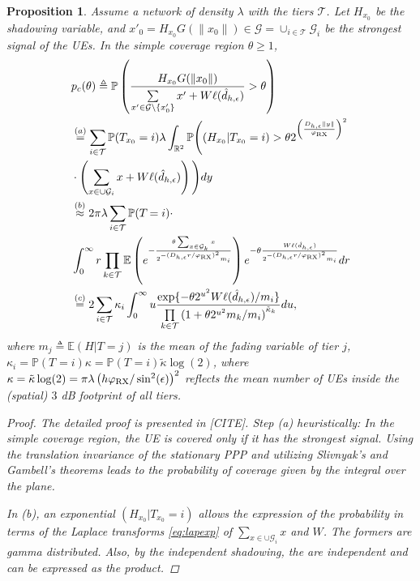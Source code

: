 \documentclass[conference]{IEEEtran}
\newcommand{\R}{\mathbb{R}}
\theoremstyle{definition}
\theoremstyle{plain}
\newtheorem{prop}[thm4]{Proposition}
\begin{document}
            
          \begin{prop}
            Assume a network of density $\lambda$ with the tiers $\mathcal{T}$. Let $H_{x_0}$ be the shadowing variable, and ${x'}_0 =  H_{x_0}G(\|x_0\|) \in \mathcal{G} =\cup_{i \in \mathcal{T}} \mathcal{G}_i$ be the strongest signal of the UEs. In the simple coverage region $\theta \geq 1$,
            \begin{align}
              \label{eq:probofcov}
              &p_c(\theta) \triangleq \mathbb{P}\left( \frac{H_{x_0} G(\|x_0\|)}{\sum\limits_{x' \in   \mathcal{G} \setminus \{x'_0\}}x'  + W\ell(\hat{d}_{h,\epsilon})} > \theta \right) \nonumber \\      
              &\overset{(a)}= \sum_{i\in \mathcal{T}} \mathbb{P}(T_{x_0}  = i)\lambda \int_{ \R^2}\mathbb{P}\Bigg((H_{x_0}|T_{x_0} = i) > \theta  2^{\left(\frac{D_{h,\epsilon}\|y\|}{\varphi_{\textup{RX}}}\right)^2 } \nonumber \\
              &\cdot \left(\sum_{x \in \cup\mathcal{G}_i }x +W\ell(\hat{d}_{h,\epsilon}) \right)\Bigg) \nonumber dy  \nonumber  \\              
              &\overset{(b)}{\approx} 2 \pi \lambda\sum_{i\in \mathcal{T}} \mathbb{P}(T_{}  = i) \cdot \nonumber \\
              &\int_{0}^{\infty} r \prod_{k \in \mathcal{T}}\mathbb{E} \left(e^{-\frac{\theta \sum_{x \in { \mathcal{G}_k}} x}{2^{-(D_{h,\epsilon}r/\varphi_{\textup{RX}})^2} m_i  }}\right)  e^{- \theta   \frac{W\ell(\hat{d}_{h,\epsilon})}{2^{-(D_{h,\epsilon}r/\varphi_{\textup{RX}})^2} m_i}} dr \nonumber \\
              &\overset{(c)}{=}  2 {} \sum_{i \in \mathcal{T}}\kappa_i\int_0^{\infty}u  \frac{\exp \{- \theta 2^{u^2}W\ell(\hat{d}_{h,\epsilon})/m_i \}}{\prod\limits_{k \in \mathcal{T}}\left(1 + \theta2^{u^2}  m_k/m_i\right)^{\tilde{\kappa}_k}} du,
            \end{align}
            where $m_j \triangleq \mathbb{E}(H| T = j)$ is the mean of the fading variable of tier $j$, ${\kappa}_i =\mathbb{P}(T_{}  = i) {\kappa}=\mathbb{P}(T_{}  = i) {\tilde{\kappa}}\log(2)$, where $  \kappa =  \tilde{\kappa}\log(2)=\pi \lambda   \left(h \varphi_{\textup{RX}}/\sin^2(\epsilon) \right)^2$ reflects the mean number of UEs inside the (spatial) $3$ dB footprint of all tiers.
            \begin{proof}
              The detailed proof is presented in [CITE]. Step (a) heuristically: In the simple coverage region, the UE is covered \textit{only if} it has the strongest signal. Using the translation invariance of the stationary PPP and utilizing Slivnyak's and Gambell's theorems leads to the probability of coverage given by the integral over the plane.

              In (b), an exponential $(H_{x_0}|T_{x_0}=i)$ allows the expression of the probability in terms of the Laplace transforms \eqref{eq:lapexp} of $\sum_{x \in \cup \mathcal{G}_i}x$ and $W$. The formers are gamma distributed. Also, by the independent shadowing, the are independent and can be expressed as the product. 
            \end{proof}
          \end{prop}
\end{document}

